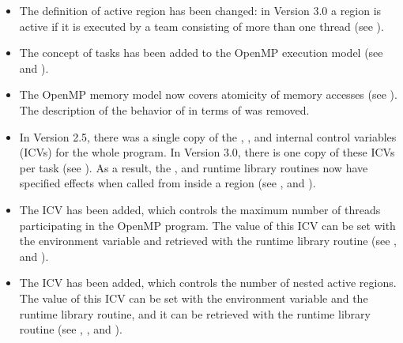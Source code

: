 \begin{itemize}
\item The definition of active  region has been changed: in 
      Version 3.0 a  region is active if it is executed by a 
      team consisting of more than one thread 
      (see ).

\item The concept of tasks has been added to the OpenMP execution model 
      (see  and ).

\item The OpenMP memory model now covers atomicity of memory accesses 
      (see ). The 
      description of the behavior of  in terms of  
      was removed.

\item In Version 2.5, there was a single copy of the , ,
       and  internal control variables (ICVs) 
      for the whole program. In Version 3.0, there is one copy of these ICVs per 
      task (see ). As a result, the 
      ,  and 
      runtime library routines now have specified effects when called from inside a
       region (see ,
       and ).

\item The  ICV has been added, which controls the maximum 
      number of threads participating in the OpenMP program. The value of this ICV 
      can be set with the  environment variable and 
      retrieved with the  runtime library routine 
      (see ,  
      and ).

\item The  ICV has been added, which controls the number
      of nested active  regions. The value of this ICV can be set 
      with the  environment variable and the
       runtime library routine, and it can be 
      retrieved with the  runtime library routine 
      (see , 
      , 
       and 
      ).


\end{itemize}
